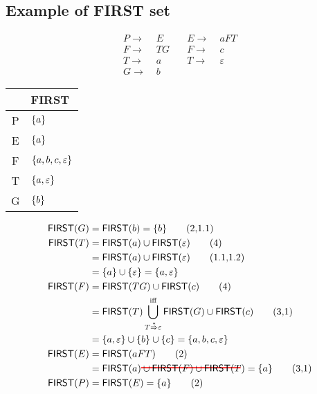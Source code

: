 \documentclass[10pt,a4paper,landscape]{article}
\begin{document}
\begin{multicols*}{3}
\section*{Example of FIRST set}
\begin{minipage}{.5\linewidth}
  \begin{align*}
    P \to &\; E \quad  &E \to &\; aFT  \\
    F \to &\; TG\quad  &F \to &\; c    \\
    T \to &\; a \quad  &T \to &\; \varepsilon  \\
    G \to &\; b
  \end{align*}
\end{minipage}
\begin{minipage}{.5\linewidth}
  \begin{tabular}{c|l}
    & \textsf{FIRST} \\
    \hline
    P &  $\{a\}$\\
    \hline
    E &  $\{a\}$\\
    \hline
    F &  $\{a,b,c,\varepsilon\}$\\
    \hline
    T & $\{a,\varepsilon\}$ \\
    \hline
    G & $\{b\}$ \\
    \hline
  \end{tabular}
\end{minipage}
\begin{align*}
  \mathsf{FIRST}(G) &= \mathsf{FIRST}(b) = \mset{b} \tag{2,1.1} \\
  \mathsf{FIRST}(T) &= \mathsf{FIRST}(a) \cup \mathsf{FIRST}(\varepsilon) \tag{4}\\
                    &= \mathsf{FIRST}(a) \cup \mathsf{FIRST}(\varepsilon) \tag{1.1,1.2} \\
                    &= \mset{a} \cup \mset{\varepsilon} = \mset{a,\varepsilon} \\
  \mathsf{FIRST}(F) &= \mathsf{FIRST}(TG) \cup \mathsf{FIRST}(c) \tag{4} \\
                    &= \mathsf{FIRST}(T) \bigcup_{T\overset{*}{\Rightarrow}\varepsilon}^{\text{iff}} \mathsf{FIRST}(G) \cup \mathsf{FIRST}(c) \tag{3,1} \\
                    &= \mset{a,\varepsilon} \cup \mset{b} \cup \mset{c} = \mset{a,b,c,\varepsilon} \\
  \mathsf{FIRST}(E) &= \mathsf{FIRST}(aFT) \tag{2} \\
                    &= \mathsf{FIRST}(a) \hcancel{\cup \mathsf{FIRST}(F) \cup \mathsf{FIRST}(T)} = \mset{a} \tag{3,1} \\
  \mathsf{FIRST}(P) &= \mathsf{FIRST}(E) = \mset{a} \tag{2}
\end{align*}

\end{multicols*}
\end{document}
